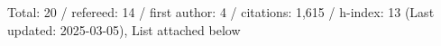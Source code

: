 Total: 20 / refereed: 14 / first author: 4 / citations: 1,615 / h-index: 13 (Last updated: 2025-03-05), List attached below